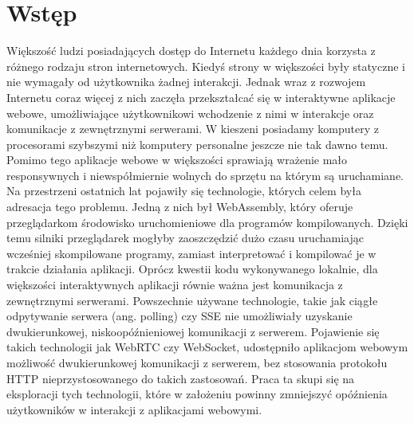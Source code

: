 \documentclass[language=polish,type=master]{aghmodern}
\author{Piotr Szczygieł}
\date{2022}
\begin{document}
\frontmatter
\maketitle

\setcounter{tocdepth}{1}
\tableofcontents

\mainmatter

\onehalfspacing

\chapter{Wstęp}
Większość ludzi posiadających dostęp do Internetu każdego dnia korzysta z różnego rodzaju stron internetowych.
Kiedyś strony w większości były statyczne i nie wymagały od użytkownika żadnej interakcji.
Jednak wraz z rozwojem Internetu coraz więcej z nich zaczęła przekształcać się w interaktywne aplikacje webowe, umożliwiające użytkownikowi wchodzenie z nimi w interakcje oraz komunikacje z zewnętrznymi serwerami.
W kieszeni posiadamy komputery z procesorami szybszymi niż komputery personalne jeszcze nie tak dawno temu.
Pomimo tego aplikacje webowe w większości sprawiają wrażenie mało responsywnych i niewspółmiernie wolnych do sprzętu na którym są uruchamiane.
Na przestrzeni ostatnich lat pojawiły się technologie, których celem była adresacja tego problemu.
Jedną z nich był WebAssembly, który oferuje przeglądarkom środowisko uruchomieniowe dla programów kompilowanych.
Dzięki temu silniki przeglądarek mogłyby zaoszczędzić dużo czasu uruchamiając wcześniej skompilowane programy, zamiast interpretować i kompilować je w trakcie działania aplikacji.
Oprócz kwestii kodu wykonywanego lokalnie, dla większości interaktywnych aplikacji równie ważna jest komunikacja z zewnętrznymi serwerami.
Powszechnie używane technologie, takie jak ciągłe odpytywanie serwera (ang. polling) czy SSE\footnotemark{} nie umożliwiały uzyskanie dwukierunkowej, niskoopóźnieniowej komunikacji z serwerem.
Pojawienie się takich technologii jak WebRTC czy WebSocket, udostępniło aplikacjom webowym możliwość dwukierunkowej komunikacji z serwerem, bez stosowania protokołu HTTP nieprzystosowanego do takich zastosowań.
Praca ta skupi się na eksploracji tych technologii, które w założeniu powinny zmniejszyć opóźnienia użytkowników w interakcji z aplikacjami webowymi.
\end{document}

